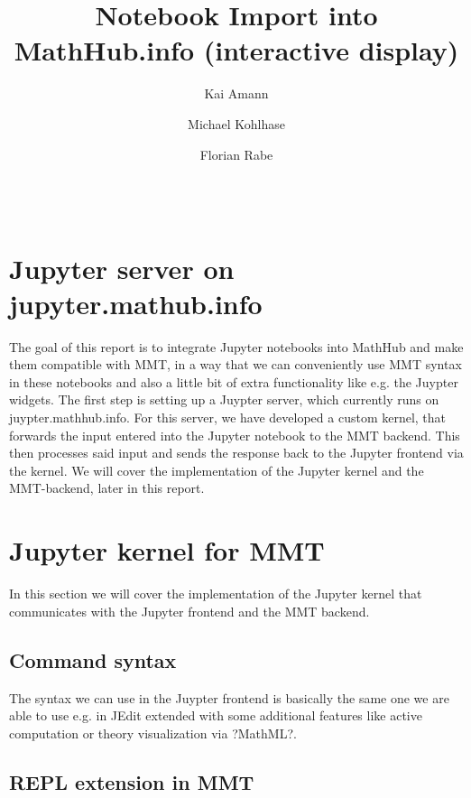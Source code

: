 \documentclass[book]{deliverablereport}
\title{Notebook Import into MathHub.info (interactive display)}
\author{Kai Amann}
\author{Michael Kohlhase}
\author{Florian Rabe}
\begin{document}
\begin{abstract}\strut\\
\end{abstract}
\maketitle
\newpage\tableofcontents\newpage

\section{Jupyter server on jupyter.mathub.info}
The goal of this report is to integrate Jupyter notebooks into MathHub
and make them compatible with MMT, in a way that we can conveniently use 
MMT syntax in these notebooks and also a little bit of extra functionality
like e.g. the Juypter widgets. The first step is setting up a Juypter server,
which currently runs on juypter.mathhub.info. %
For this server, we have developed a custom kernel, that forwards the input 
entered into the Jupyter notebook to the MMT backend. This then processes 
said input and sends the response back to the Jupyter frontend via the kernel.
We will cover the implementation of the Jupyter kernel and the MMT-backend,
later in this report.

\section{Jupyter kernel for MMT} %
In this section we will cover the implementation of the Jupyter kernel that
communicates with the Jupyter frontend and the MMT backend. 
\subsection{Command syntax}
The syntax we can use in the Juypter frontend is basically the same one we are able to 
use e.g. in JEdit extended with some additional features like active computation
or theory visualization via ?MathML?. 
\subsection{REPL extension in MMT}
% 
\end{document}
